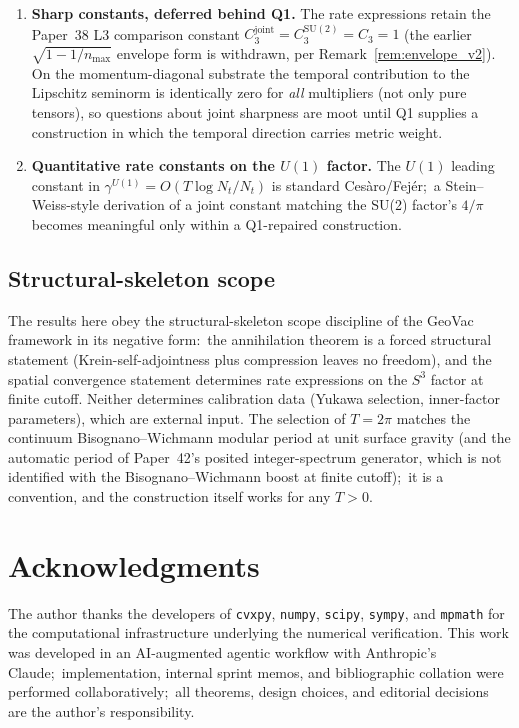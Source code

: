 \documentclass[11pt,a4paper]{article}
\theoremstyle{plain}
\theoremstyle{definition}
\newcommand{\nmax}{n_{\max}}
\newcommand{\Nt}{N_{t}}
\newcommand{\sthree}{S^{3}}
\newcommand{\SU}{\mathrm{SU}}
\newcommand{\Uone}{U(1)}
\newcommand{\gammaU}{\gamma^{\Uone}}
\newcommand{\Cthreejoint}{C_{3}^{\mathrm{joint}}}
\newcommand{\CthreeSU}{C_{3}^{\SU(2)}}
\begin{document}
\begin{enumerate}
\item[(Q4)] \textbf{Sharp constants, deferred behind Q1.} The rate
expressions retain the Paper~38 L3 comparison constant
$\Cthreejoint = \CthreeSU = C_{3} = 1$ (the earlier
$\sqrt{1 - 1/\nmax}$ envelope form is withdrawn, per
Remark~\ref{rem:envelope_v2}). On the momentum-diagonal substrate the temporal contribution to
the Lipschitz seminorm is identically zero for \emph{all} multipliers
(not only pure tensors), so questions about joint sharpness are moot
until Q1 supplies a construction in which the temporal direction
carries metric weight.

\item[(Q5)] \textbf{Quantitative rate constants on the $\Uone$ factor.}
The $\Uone$ leading constant in $\gammaU = O(T\log\Nt/\Nt)$ is standard
Cesàro/Fej\'er;\ a Stein--Weiss-style derivation of a joint constant
matching the SU(2) factor's $4/\pi$ becomes meaningful only within a
Q1-repaired construction.
\end{enumerate}

\subsection{Structural-skeleton scope}\label{sec:scope_skeleton}

The results here obey the structural-skeleton scope discipline of
the GeoVac framework in its negative form:\ the annihilation theorem is a
forced structural statement (Krein-self-adjointness plus compression
leaves no freedom), and the spatial convergence statement determines
rate expressions on the $\sthree$ factor at finite cutoff. Neither
determines calibration data (Yukawa selection, inner-factor
parameters), which are external input. The selection of $T = 2\pi$
matches the continuum Bisognano--Wichmann modular period at unit surface
gravity (and the automatic period of Paper~42's posited
integer-spectrum generator, which is not identified with the
Bisognano--Wichmann boost at finite cutoff);\ it is a convention, and the
construction itself works for any $T > 0$.

\section*{Acknowledgments}

The author thanks the developers of \texttt{cvxpy}, \texttt{numpy},
\texttt{scipy}, \texttt{sympy}, and \texttt{mpmath} for the
computational infrastructure underlying the numerical verification.
This work was developed in an AI-augmented agentic workflow with
Anthropic's Claude;\ implementation, internal sprint memos, and
bibliographic collation were performed collaboratively;\ all
theorems, design choices, and editorial decisions are the author's
responsibility.
\end{document}
